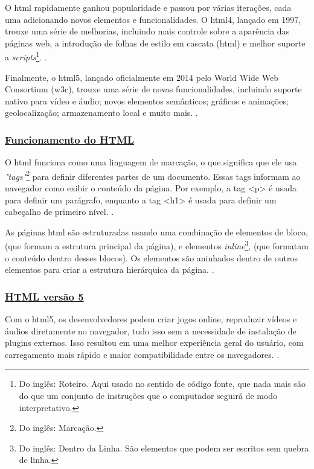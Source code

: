 O
\acrshort{html}
rapidamente ganhou popularidade e passou por várias iterações, cada uma
adicionando novos elementos e funcionalidades. O
\acrshort{html}4,
lançado em 1997, trouxe uma
série de melhorias, incluindo mais controle sobre a aparência das páginas web, a introdução
de folhas de estilo em cascata
(\acrshort{html})
e melhor suporte a
\textit{scripts}\footnote{Do inglês: Roteiro. Aqui usado no sentido de código fonte, que nada mais são
    do que um conjunto de instruções que o computador seguirá de modo interpretativo.
}.
\cite{w3c}.

Finalmente, o
\acrshort{html}5,
lançado oficialmente em 2014 pelo World Wide Web
Consortium (\acrshort{w3c}), trouxe uma série de novas funcionalidades, incluindo suporte nativo para
vídeo e áudio; novos elementos semânticos; gráficos e animações; geolocalização;
armazenamento local e muito mais.
\cite{w3c}.

\subsubsection{\underline{Funcionamento do HTML}}

O
\acrshort{html}
funciona como uma linguagem de marcação, o que significa que ele usa
\textit{"tags"}\footnote{Do inglês: Marcação.
}
para definir diferentes partes de um documento. Essas tags informam ao navegador
como exibir o conteúdo da página. Por exemplo, a tag
<p>
é usada para definir um parágrafo,
enquanto a tag
<h1>
é usada para definir um cabeçalho de primeiro nível.
\cite{w3c}.

As páginas
\acrshort{html}
são estruturadas usando uma combinação de elementos de bloco,
(que formam a estrutura principal da página), e elementos
\textit{inline}\footnote{Do inglês: Dentro da Linha. São elementos que podem ser escritos sem quebra de linha.
},
(que formatam o conteúdo
dentro desses blocos). Os elementos são aninhados dentro de outros elementos para criar a
estrutura hierárquica da página.
\cite{w3c}.

\subsubsection{\underline{HTML versão 5}}

Com o
\acrshort{html}5,
os desenvolvedores podem criar jogos online, reproduzir vídeos e
áudios diretamente no navegador, tudo isso sem a necessidade de instalação de plugins
externos. Isso resultou em uma melhor experiência geral do usuário, com carregamento mais
rápido e maior compatibilidade entre os navegadores.
\cite{w3c}.


